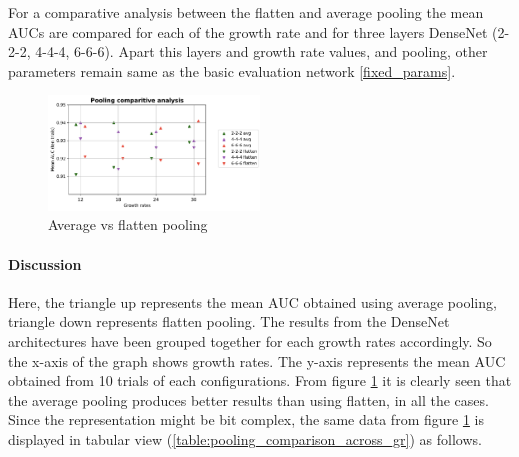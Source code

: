 For a comparative analysis between the flatten and average pooling the mean AUCs are compared for each of the growth rate and for three layers DenseNet (2-2-2, 4-4-4, 6-6-6). Apart this layers and growth rate values, and pooling, 
other parameters remain same as the basic evaluation network \ref{fixed_params}.

\begin{figure}[ht]
\centering
\includegraphics[width=0.5\textwidth]{images/densenet/simple/densenet_simple_three_layer_pooling_compare}
\caption{Average vs flatten pooling}
\label{fig:densenet_simple_three_layer_pooling_compare}
\end{figure}

\paragraph{Discussion\\}
Here, the triangle up represents the mean AUC obtained using average pooling, triangle down represents flatten pooling. The results from the DenseNet
architectures have been grouped together for each growth rates accordingly. So the x-axis of the graph shows growth rates. The y-axis represents the mean AUC obtained from 10 trials of each configurations.
From figure \ref{fig:densenet_simple_three_layer_pooling_compare} it is clearly seen that the average pooling produces better results than using flatten, in all the cases. 
Since the representation might be bit complex, the same data from figure \ref{fig:densenet_simple_three_layer_pooling_compare} is displayed in tabular view (\ref{table:pooling_comparison_across_gr}) as follows.

